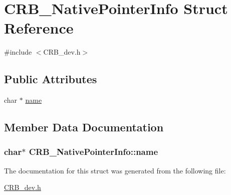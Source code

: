 \hypertarget{struct_c_r_b___native_pointer_info}{}\section{C\+R\+B\+\_\+\+Native\+Pointer\+Info Struct Reference}
\label{struct_c_r_b___native_pointer_info}


{\ttfamily \#include $<$C\+R\+B\+\_\+dev.\+h$>$}

\subsection*{Public Attributes}
\begin{DoxyCompactItemize}
\item 
char $\ast$ \hyperlink{struct_c_r_b___native_pointer_info_a5bd97f52968a21784a12a79995834703}{name}
\end{DoxyCompactItemize}


\subsection{Member Data Documentation}
\hypertarget{struct_c_r_b___native_pointer_info_a5bd97f52968a21784a12a79995834703}{}
\subsubsection[{name}]{\setlength{\rightskip}{0pt plus 5cm}char$\ast$ C\+R\+B\+\_\+\+Native\+Pointer\+Info\+::name}\label{struct_c_r_b___native_pointer_info_a5bd97f52968a21784a12a79995834703}


The documentation for this struct was generated from the following file\+:\begin{DoxyCompactItemize}
\item 
\hyperlink{_c_r_b__dev_8h}{C\+R\+B\+\_\+dev.\+h}\end{DoxyCompactItemize}
